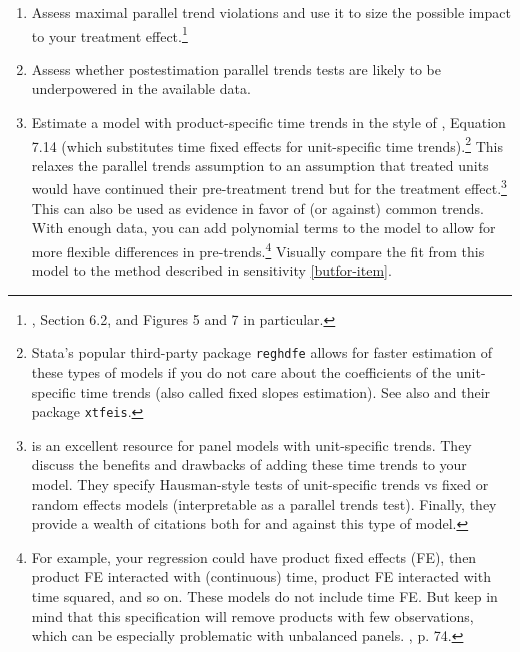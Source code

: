 \documentclass[12pt]{article}
\begin{document}
\begin{enumerate}
\begin{enumerate}
{        \\\\
        Keep in mind the visual interpretation guidelines from \citet{roth2024a} for new estimators. In particular, the Borusyak et al. imputation estimator pre-trend coefficients should be considered separately from post-trend coefficients. \citet{roth2024a}, Section 3.3.}
        \item Assess maximal parallel trend violations and use it to size the possible impact to your treatment effect.\footnote{\citet{rambachan2023more}, Section 6.2, and Figures 5 and 7 in particular.}
        \item Assess whether postestimation parallel trends tests are likely to be underpowered in the available data.
        \item Estimate a model with product-specific time trends in the style of \citet{wooldridge2021two}, Equation 7.14 (which substitutes time fixed effects for unit-specific time trends).\footnote{Stata’s popular third-party package \texttt{reghdfe} allows for faster estimation of these types of models if you do not care about the coefficients of the unit-specific time trends (also called fixed slopes estimation). See also \citet{ruttenauer2023fixed} and their package \texttt{xtfeis}.}  This relaxes the parallel trends assumption to an assumption that treated units would have continued their pre-treatment trend but for the treatment effect.\footnote{\citet{ruttenauer2023fixed} is an excellent resource for panel models with unit-specific trends. They discuss the benefits and drawbacks of adding these time trends to your model. They specify Hausman-style tests of unit-specific trends vs fixed or random effects models (interpretable as a parallel trends test). Finally, they provide a wealth of citations both for and against this type of model.}  This can also be used as evidence in favor of (or against) common trends. With enough data, you can add polynomial terms to the model to allow for more flexible differences in pre-trends.\footnote{For example, your regression could have product fixed effects (FE), then product FE interacted with (continuous) time, product FE interacted with time squared, and so on. These models do not include time FE. But keep in mind that this specification will remove products with few observations, which can be especially problematic with unbalanced panels. \citet{ruttenauer2023fixed}, p. 74.}  Visually compare the fit from this model to the method described in sensitivity \ref{butfor-item}.
    \end{enumerate}

\end{enumerate}
\end{document}
